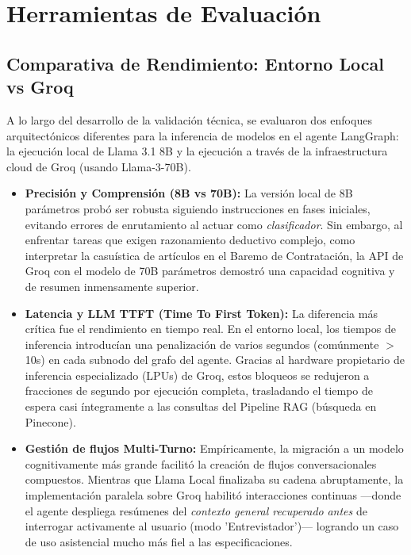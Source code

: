 \documentclass[12pt,a4paper,oneside]{report}
\begin{document}
\section{Herramientas de Evaluación}

\subsection{Comparativa de Rendimiento: Entorno Local vs Groq}

A lo largo del desarrollo de la validación técnica, se evaluaron dos enfoques arquitectónicos diferentes para la inferencia de modelos en el agente LangGraph: la ejecución local de Llama 3.1 8B y la ejecución a través de la infraestructura cloud de Groq (usando Llama-3-70B).

\begin{itemize}
    \item \textbf{Precisión y Comprensión (8B vs 70B):} La versión local de 8B parámetros probó ser robusta siguiendo instrucciones en fases iniciales, evitando errores de enrutamiento al actuar como \textit{clasificador}. Sin embargo, al enfrentar tareas que exigen razonamiento deductivo complejo, como interpretar la casuística de artículos en el Baremo de Contratación, la API de Groq con el modelo de 70B parámetros demostró una capacidad cognitiva y de resumen inmensamente superior.
    \item \textbf{Latencia y LLM TTFT (Time To First Token):} La diferencia más crítica fue el rendimiento en tiempo real. En el entorno local, los tiempos de inferencia introducían una penalización de varios segundos (comúnmente $>$10s) en cada subnodo del grafo del agente. Gracias al hardware propietario de inferencia especializado (LPUs) de Groq, estos bloqueos se redujeron a fracciones de segundo por ejecución completa, trasladando el tiempo de espera casi íntegramente a las consultas del Pipeline RAG (búsqueda en Pinecone).
    \item \textbf{Gestión de flujos Multi-Turno:} Empíricamente, la migración a un modelo cognitivamente más grande facilitó la creación de flujos conversacionales compuestos. Mientras que Llama Local finalizaba su cadena abruptamente, la implementación paralela sobre Groq habilitó interacciones continuas —donde el agente despliega resúmenes del \textit{contexto general recuperado} \textit{antes} de interrogar activamente al usuario (modo 'Entrevistador')— logrando un caso de uso asistencial mucho más fiel a las especificaciones.
\end{itemize}
\end{document}

